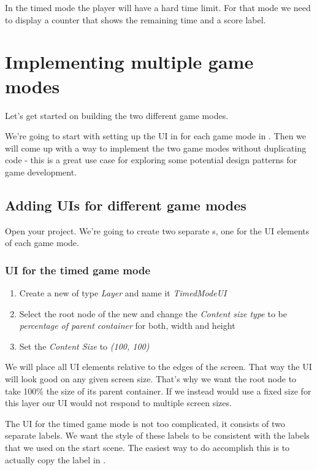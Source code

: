 In the timed mode the player will have a hard time limit. For that mode
we need to display a counter that shows the remaining time and a score label.

\section{Implementing multiple game modes}
Let's get started on building the two different game modes. 

We're going to start with setting up the UI in for each game mode in \SB{}. Then
we will come up with a way to implement the two game modes without duplicating
code - this is a great use case for exploring some potential design patterns for
game development.

\subsection{Adding UIs for different game modes}
Open your \SB{} project. We're going to create two separate \ccbfile{}s, one for
the UI elements of each game mode.

\subsubsection{UI for the timed game mode}
\begin{leftbar}
\begin{enumerate}
  \item Create a new \ccbfile{} of type \textit{Layer} and name it
  \textit{TimedModeUI}
  \item Select the root node of the new \ccbfile{} and change the
  \textit{Content size type} to be \textit{percentage of parent container} for
  both, width and height
  \item Set the \textit{Content Size} to \textit{(100, 100)}
\end{enumerate}
\end{leftbar}

We will place all UI elements relative to the edges of the screen. That way the
UI will look good on any given screen size. That's why we want the root node to
take 100\% the size of its parent container. If we instead would use a fixed
size for this layer our UI would not respond to multiple screen sizes.

The UI for the timed game mode is not too complicated, it consists of two
separate labels. We want the style of these labels to be consistent with the
labels that we used on the start scene. The easiest way to do accomplish this is
to actually copy the label in \SB{}.

